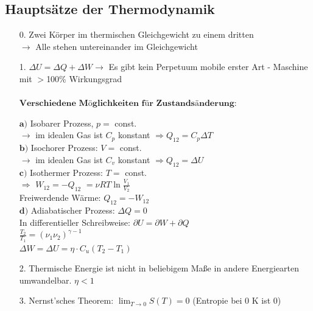 \documentclass[german]{latex4ei/latex4ei_sheet}
\begin{document}
\subsection{Hauptsätze der Thermodynamik}

\begin{itemize}
\item[0.] Zwei Körper im thermischen Gleichgewicht zu einem dritten\\ $\rightarrow$ Alle stehen untereinander im Gleichgewicht\\
\item[1.] $\Delta U = \Delta Q + \Delta W \rightarrow $ Es gibt kein Perpetuum mobile erster Art - Maschine mit $>$100\% Wirkungsgrad\\ \\
$\textbf{Verschiedene Möglichkeiten für Zustandsänderung:}$
\begin{sectionbox}
$\textbf{a)}$ Isobarer Prozess, $p =$ const.\\ $\rightarrow$ im idealen Gas ist $C_p$ konstant $\Rightarrow Q_{12} = C_p \Delta T$\\
$\textbf{b)}$ Isochorer Prozess: $V =$ const.\\ $\rightarrow$ im idealen Gas ist $C_v$ konstant $\Rightarrow Q_{12} = \Delta U$\\
$\textbf{c)}$ Isothermer Prozess: $T =$ const.\\ $\Rightarrow$ $W_{12} = -Q_{12}$ %
$ =\nu RT \ln\frac{V_1}{V_2}$
\\Freiwerdende Wärme: $Q_{12} = -W_{12}$\\
$\textbf{d)}$ Adiabatischer Prozess: $\Delta Q = 0$\\
In differentieller Schreibweise: $\partial U = \partial W + \partial Q $\\
$\frac{T_2}{T_1}=({\nu_1}{\nu_2})^{\gamma -1}$\\
$\Delta W = \Delta U = \eta \cdot C_u(T_2-T_1)$
\end{sectionbox}
\item[2.] Thermische Energie ist nicht in beliebigem Maße in andere Energiearten umwandelbar. $\eta < 1$
\item[3.] Nernst'sches Theorem: $\lim_{T \rightarrow 0} S(T) = 0$ (Entropie bei 0 K ist 0)\\
\end{itemize}
\end{document}
